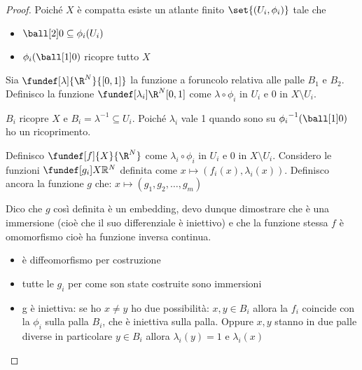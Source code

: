 \begin{proof}
 Poiché $X$ è compatta esiste un atlante finito $\set{(U_i, \phi_i)}$ tale che 
 \begin{itemize}
  \item $\ball[2]0 \subseteq {\phi}_{i}(U_{i})$
  \item ${\phi_{i}(\ball[1]0)}$ ricopre tutto $X$
  \end{itemize}
 Sia $\fundef[\lambda]{\R^N}{[0, 1]}$ la funzione a foruncolo relativa alle palle $B_{1}$ e $B_{2}$. Definisco la funzione $\fundef[\lambda_{i}]{\R^N}{[0, 1]}$
 come $\lambda \circ \phi_{i}$ in $U_{i}$ e $0$ in $X \setminus U_{i}$.
 
 ${B_{i}}$ ricopre $X$ e $B_{i} = {\lambda}^{-1} \subseteq U_{i}$. Poiché $\lambda_i$ vale 1 quando sono su ${\phi_{i}}^{-1} (\ball[1]0)$ ho un ricoprimento.
 
 
 
 Definisco $\fundef[f]{X}{\R^N}$ come $\lambda_{i} \circ \phi_{i}$ in $U_{i}$ e $0$ in $X \setminus U_{i}$. Considero le funzioni $\fundef[g_{i}]{X}{\mathbb{R}^{N}}$
 definita come $x \mapsto (f_{i}(x), \lambda_{i}(x))$. Definisco ancora la funzione $g$ che: $x \mapsto (g_1, g_2, \dots, g_m)$
 
 Dico che $g$ così definita è un embedding, devo dunque dimostrare che è una immersione (cioè che il suo differenziale è iniettivo) e che la funzione stessa $f$ è omomorfismo cioè
 ha funzione inversa continua.
 
 
 \begin {itemize}
  \item è diffeomorfismo per costruzione
  \item tutte le $g_{i}$ per come son state costruite sono immersioni
  \item g è iniettiva: se ho $x \neq y$  ho due possibilità: $x, y \in B_{i}$ allora la $f_i$ coincide con la $\phi_i$ sulla palla $B_{i}$, che è iniettiva sulla palla. 
  Oppure $x, y$ stanno in due palle diverse in particolare $y \in B_{i}$ allora $\lambda_{i}(y) = 1$ e $\lambda_{i}(x)$ 
  \qedhere
 \end {itemize}
\end{proof}

